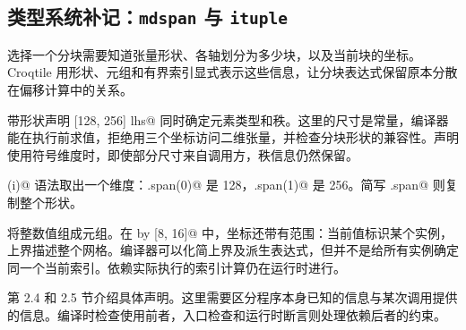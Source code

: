 \subsection*{类型系统补记：\texttt{mdspan} 与 \texttt{ituple}}

选择一个分块需要知道张量形状、各轴划分为多少块，以及当前块的坐标。Croqtile 用形状、元组和有界索引显式表示这些信息，让分块表达式保留原本分散在偏移计算中的关系。

带形状声明  [128, 256] lhs@ 同时确定元素类型和秩。这里的尺寸是常量，编译器能在执行前求值，拒绝用三个坐标访问二维张量，并检查分块形状的兼容性。声明使用符号维度时，即使部分尺寸来自调用方，秩信息仍然保留。

\co@span(i)@ 语法取出一个维度：\co@lhs.span(0)@ 是 128，\co@rhs.span(1)@ 是 256。简写 \co@lhs.span@ 则复制整个形状。

\co@ituple@ 将整数值组成元组。在  by [8, 16]@ 中，坐标还带有范围：当前值标识某个实例，上界描述整个网格。编译器可以化简上界及派生表达式，但并不是给所有实例确定同一个当前索引。依赖实际执行的索引计算仍在运行时进行。

第 2.4 和 2.5 节介绍具体声明。这里需要区分程序本身已知的信息与某次调用提供的信息。编译时检查使用前者，入口检查和运行时断言则处理依赖后者的约束。
